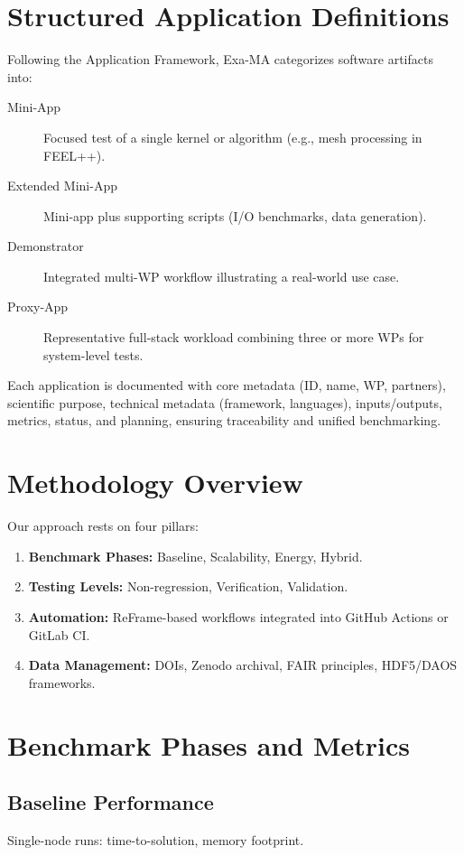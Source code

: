 \section{Structured Application Definitions}
Following the Application Framework, Exa-MA categorizes software artifacts into:

\begin{description}
  \item[Mini-App] Focused test of a single kernel or algorithm (e.g., mesh processing in FEEL++).
  \item[Extended Mini-App] Mini-app plus supporting scripts (I/O benchmarks, data generation).
  \item[Demonstrator] Integrated multi-WP workflow illustrating a real-world use case.
  \item[Proxy-App] Representative full-stack workload combining three or more WPs for system-level tests.
\end{description}

Each application is documented with core metadata (ID, name, WP, partners), scientific purpose, technical metadata (framework, languages), inputs/outputs, metrics, status, and planning, ensuring traceability and unified benchmarking.

\section{Methodology Overview}
Our approach rests on four pillars:
\begin{enumerate}
  \item \textbf{Benchmark Phases:} Baseline, Scalability, Energy, Hybrid.
  \item \textbf{Testing Levels:} Non-regression, Verification, Validation.
  \item \textbf{Automation:} ReFrame-based workflows integrated into GitHub Actions or GitLab CI.
  \item \textbf{Data Management:} DOIs, Zenodo archival, FAIR principles, HDF5/DAOS frameworks.
\end{enumerate}

\section{Benchmark Phases and Metrics}
\subsection{Baseline Performance}
Single-node runs: time-to-solution, memory footprint.

